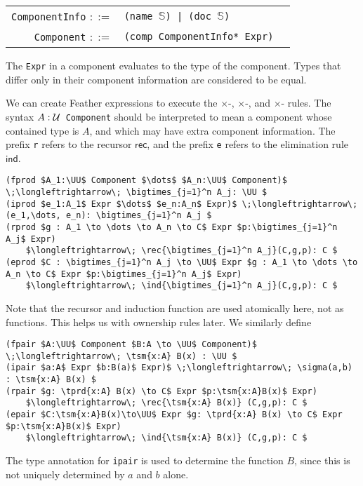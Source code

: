 \documentclass[11pt]{book}
\DeclareMathOperator*{\bigtimes}{\scalerel*{\times}{\textstyle\sum}}
\begin{document}
\begin{tabular}{r l p{7cm}}
  \lstinline!ComponentInfo! \( ::= \) & \lstinline!(name !\( \mathbb S \)\lstinline!) | (doc !\( \mathbb S \)\lstinline!)! \\
  \lstinline!Component! \( ::= \) & \lstinline!(comp ComponentInfo* Expr)!
\end{tabular}

The \lstinline{Expr} in a component evaluates to the type of the component.
Types that differ only in their component information are considered to be equal.

We can create Feather expressions to execute the \( \times \)-\rform, \( \times \)-\rintro, and \( \times \)-\relim{} rules.
The syntax \( A:\mathcal{U} \)\lstinline! Component! should be interpreted to mean a component whose contained type is \( A \), and which may have extra component information.
The prefix \lstinline{r} refers to the recursor \( \mathsf{rec} \), and the prefix \lstinline{e} refers to the elimination rule \( \mathsf{ind} \).
\begin{lstlisting}[mathescape=true]
(fprod $A_1:\UU$ Component $\dots$ $A_n:\UU$ Component)$ \;\longleftrightarrow\; \bigtimes_{j=1}^n A_j: \UU $
(iprod $e_1:A_1$ Expr $\dots$ $e_n:A_n$ Expr)$ \;\longleftrightarrow\; (e_1,\dots, e_n): \bigtimes_{j=1}^n A_j $
(rprod $g : A_1 \to \dots \to A_n \to C$ Expr $p:\bigtimes_{j=1}^n A_j$ Expr)
    $\longleftrightarrow\; \rec{\bigtimes_{j=1}^n A_j}(C,g,p): C $
(eprod $C : \bigtimes_{j=1}^n A_j \to \UU$ Expr $g : A_1 \to \dots \to A_n \to C$ Expr $p:\bigtimes_{j=1}^n A_j$ Expr)
    $\longleftrightarrow\; \ind{\bigtimes_{j=1}^n A_j}(C,g,p): C $
\end{lstlisting}
Note that the recursor and induction function are used atomically here, not as functions.
This helps us with ownership rules later.
We similarly define
\begin{lstlisting}[mathescape=true]
(fpair $A:\UU$ Component $B:A \to \UU$ Component)$ \;\longleftrightarrow\; \tsm{x:A} B(x) : \UU $
(ipair $a:A$ Expr $b:B(a)$ Expr)$ \;\longleftrightarrow\; \sigma(a,b) : \tsm{x:A} B(x) $
(rpair $g: \tprd{x:A} B(x) \to C$ Expr $p:\tsm{x:A}B(x)$ Expr)
    $\longleftrightarrow\; \rec{\tsm{x:A} B(x)} (C,g,p): C $
(epair $C:\tsm{x:A}B(x)\to\UU$ Expr $g: \tprd{x:A} B(x) \to C$ Expr $p:\tsm{x:A}B(x)$ Expr)
    $\longleftrightarrow\; \ind{\tsm{x:A} B(x)} (C,g,p): C $
\end{lstlisting}
The type annotation for \lstinline{ipair} is used to determine the function \( B \), since this is not uniquely determined by \( a \) and \( b \) alone.
\end{document}
